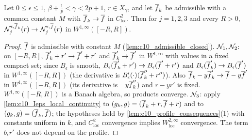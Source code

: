 \begin{lemma}
  \label{lem:c10_N_local_convergence}
  Let $0\le\epsilon\le1$, $\beta+\frac1p<\gamma<2p+1$, $r\in X_\gamma$, and let $\overline{f}_k$ be admissible with
  a common constant $M$ with $\overline{f}_k\to\overline{f}$ in $C^2_{\mathrm{loc}}$. Then for $j=1,2,3$ and every $R>0$,
  $\mathcal{N}_j^{\epsilon,\overline{f}_k}(r)\to\mathcal{N}_j^{\epsilon,\overline{f}}(r)$ in $W^{1,\infty}([-R,R])$.
\end{lemma}
\begin{proof}
  $\overline{f}$ is admissible with constant $M$ (\cref{lem:c10_admissible_closed}).
  $\mathcal{N}_1,\mathcal{N}_2$: on $[-R,R]$, $\overline{f}_k'+r'\to\overline{f}'+r'$ and $\overline{f}_k'\to\overline{f}'$ in $W^{1,\infty}$ with values in a
  fixed compact set; since $B_\epsilon$ is smooth, $B_\epsilon(\overline{f}_k'+r')\to B_\epsilon(\overline{f}'+r')$ and
  $B_\epsilon(\overline{f}_k')\to B_\epsilon(\overline{f}')$ in $W^{1,\infty}([-R,R])$ (the derivative is
  $B_\epsilon'(\cdot)(\overline{f}_k''+r'')$). Also $\overline{f}_k-y\overline{f}_k'\to\overline{f}-y\overline{f}'$ in $W^{1,\infty}([-R,R])$ (its
  derivative is $-y\overline{f}_k''$) and $r-yr'$ is fixed. $W^{1,\infty}([-R,R])$ is a Banach algebra, so products converge.
  $\mathcal{N}_3$: apply \cref{lem:c10_Ieps_local_continuity} to $(g_k,g)=(\overline{f}_k+r,\overline{f}+r)$ and to
  $(g_k,g)=(\overline{f}_k,\overline{f})$; the hypotheses hold by \cref{lem:c10_profile_consequences}(1) with constants
  uniform in $k$, and $C^2_{\mathrm{loc}}$ convergence implies $W^{2,\infty}_{\mathrm{loc}}$ convergence.
  The term $b_\epsilon r'$ does not depend on the profile.
\end{proof}

